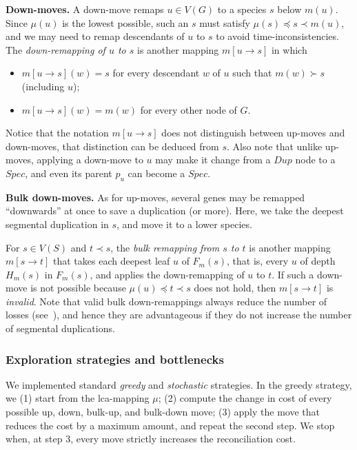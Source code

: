 \documentclass[10pt]{article}
\begin{document}
\medskip 

\noindent 
\textbf{Down-moves.}
A down-move remaps $u \in V(G)$ to a species $s$ below $m(u)$.  Since $\mu(u)$ is the lowest possible, such an $s$ must satisfy $\mu(s) \preceq s \prec m(u)$, and we may need to remap descendants of $u$ to $s$ to avoid time-inconsistencies.
The \emph{down-remapping of $u$ to $s$} is another mapping $m[u \rightarrow s]$ in which
\begin{itemize}
    \item 
    $m[u \rightarrow s](w) = s$ for every descendant $w$ of $u$ such that $m(w) \succ s$ (including $u$);

    \item 
    $m[u \rightarrow s](w) = m(w)$ for every other node of $G$.
    
\end{itemize}


Notice that the notation $m[u \rightarrow s]$ does not distinguish between up-moves and down-moves, that distinction can be deduced from $s$.
Also note that unlike up-moves, applying a down-move to $u$ may make it change from a $Dup$ node to a $Spec$, and even its parent $p_u$ can become a $Spec$.


\medskip 

\noindent
\textbf{Bulk down-moves.} As for up-moves, several genes may be remapped ``downwards'' at once to save a duplication (or more).  Here, we take the deepest segmental duplication in $s$, and move it to a lower species.

For $s \in V(S)$ and $t \prec s$, the \emph{bulk remapping from $s$ to $t$} is another mapping $m[s \rightarrow t]$ that takes each deepest leaf $u$ of $F_m(s)$, that is, every $u$ of depth $H_m(s)$ in $F_m(s)$, and applies the down-remapping of $u$ to $t$.  If such a down-move is not possible because $\mu(u) \preceq t \prec s$ does not hold, then $m[s \rightarrow t]$ is \emph{invalid}.  
Note that valid bulk down-remappings always reduce the number of losses (see~\cite{dondi2019reconciling}), and hence they are advantageous if they do not increase the number of segmental duplications.  


\subsubsection*{Exploration strategies and bottlenecks}

We implemented standard \emph{greedy} and \emph{stochastic} strategies.
In the greedy strategy, we (1) start from the lca-mapping $\mu$; (2) compute the change in cost of every possible up, down, bulk-up, and bulk-down move; (3) apply the move that reduces the cost by a maximum amount, and repeat the second step.  We stop when, at step 3, every move strictly increases the reconciliation cost.
\end{document}
